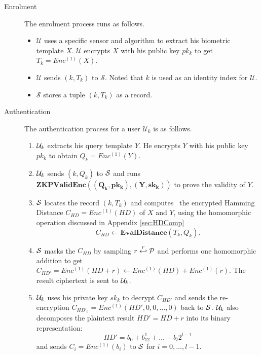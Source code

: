 \begin{description}
\begin{itemize}
	\end{itemize}
	\item[Enrolment] The enrolment process runs as follows.
	\begin{itemize}
		\item $\mathcal{U}$ uses a specific sensor and algorithm to
		extract his biometric template $X$. $\mathcal{U}$
		encrypts $X$ with his public key $pk_k$ to get
		$T_k = Enc^{(1)}(X)$.
		\item $\mathcal{U}$ sends $(k,T_k)$ to $\mathcal{S}$.
		Noted that $k$
		is used as an identity index for $\mathcal{U}$.
		\item $\mathcal{S}$ stores a tuple $(k, T_k)$ as a
		record.
	\end{itemize}
	\item[Authentication] The authentication process for a user
	$\mathcal{U}_k$ is as follows.
	\begin{enumerate}
		\item $\mathcal{U}_k$ extracts his query template $Y$. He
		encrypts $Y$ with his public key $pk_k$ to obtain
		$Q_k = Enc^{(1)}(Y)$.\label{protocol:step1}
		\item $\mathcal{U}_k$ sends $(k,Q_k)$ to $\mathcal{S}$ and
		runs $\mathbf{ZKPValidEnc((Q_k,pk_k),(Y,sk_k))}$ to prove the
		validity of $Y$.\label{protocol:step2}
		\item $\mathcal{S}$ locates the record $(k,T_k)$ and computes
		\                        the encrypted Hamming Distance $C_{HD} = Enc^{(1)}(
		HD)$ of $X$ and
		$Y$, using the homomorphic operation discussed in
		Appendix \ref{sec:HDComp}
		$$C_{HD} \gets
		\textbf{EvalDistance}(T_k,Q_k).$$\label{protocol:step3}
		\item $\mathcal{S}$ masks the $C_{HD}$ by sampling $r
		\stackrel{r}{\hookleftarrow} \mathcal{P}$
		and performs one homomorphic addition to get
		$C_{HD'} = Enc^{(1)}(HD + r) \gets Enc^{(1)}(HD) + Enc^{(1)}(r)$.
		The result ciphertext is sent to $\mathcal{U}_k$.\label{protocol:step4}
		\item $\mathcal{U}_k$ uses his private key $sk_k$ to decrypt $C_{HD'}$
		and sends
		the re-encryption $C_{HD'_0} = Enc^{(1)}(HD',0,0,\dots,0)$ back to $\mathcal{S}$.
		$\mathcal{U}_k$ also decomposes the plaintext result
		$HD' = HD+r$ into its binary representation:
		\[
		HD' = b_0 + b_12^1 + \dots + b_l2^{l-1}
		\]
		and sends $C_i = Enc^{(1)}(b_i)$ to $\mathcal{S}$
		for $i = 0, \dots, l-1$.\label{protocol:step5}


\end{enumerate}
\end{description}
